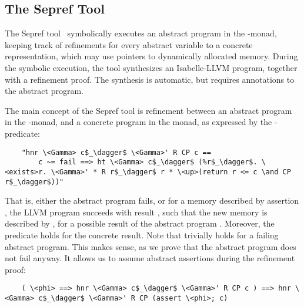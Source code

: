 \documentclass[sn-mathphys,Numbered]{sn-jnl}
\theoremstyle{thmstyleone}%
\theoremstyle{definition}%
\theoremstyle{thmstylethree}%
\begin{document}
  \subsection{The Sepref Tool}
  The Sepref tool~\cite{La15,La19-llvm} symbolically executes an abstract program in the -monad,
  keeping track of refinements for every abstract variable to a concrete representation, which may use pointers to dynamically allocated memory.
  During the symbolic execution, the tool synthesizes an Isabelle-LLVM program, together with a refinement proof.
  The synthesis is automatic, but requires annotations to the abstract program.

  The main concept of the Sepref tool is refinement between an abstract program  in the -monad,
  and a concrete program  in the  monad, as expressed by the -predicate:
  \begin{lstlisting}
    "hnr \<Gamma> c$_\dagger$ \<Gamma>' R CP c ==
        c ~= fail ==> ht \<Gamma> c$_\dagger$ (%r$_\dagger$. \<exists>r. \<Gamma>' * R r$_\dagger$ r * \<up>(return r <= c \and CP r$_\dagger$))"
  \end{lstlisting}
  That is, either the abstract program  fails,
  or for a memory described by assertion ,
  the LLVM program  succeeds with result ,
  such that the new memory is described by ,
  for a possible result  of the abstract program . Moreover, the predicate  holds for the concrete result.
  Note that  trivially holds for a failing abstract program. This makes sense, as we prove that
  the abstract program does not fail anyway. It allows us to assume abstract assertions during the refinement proof:
  \begin{lstlisting}
    ( \<phi> ==> hnr \<Gamma> c$_\dagger$ \<Gamma>' R CP c ) ==> hnr \<Gamma> c$_\dagger$ \<Gamma>' R CP (assert \<phi>; c)
  \end{lstlisting}
\end{document}
